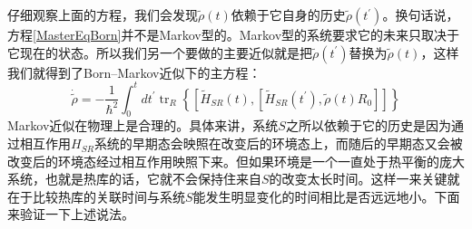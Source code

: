 仔细观察上面的方程，我们会发现$\tilde{\rho}(t)$依赖于它自身的历史$\tilde{\rho}\left(t^{\prime}\right)$。换句话说，方程\eqref{MasterEqBorn}并不是Markov型的。Markov型的系统要求它的未来只取决于它现在的状态。所以我们另一个要做的主要近似就是把$\tilde{\rho}\left(t^{\prime}\right)$替换为$\tilde{\rho}(t)$，这样我们就得到了Born--Markov近似下的主方程：
\begin{equation}
\dot{\tilde{\rho}}=-\frac{1}{\hbar^{2}} \int_{0}^{t} d t^{\prime} \operatorname{tr}_{R}\left\{\left[\tilde{H}_{S R}(t),\left[\tilde{H}_{S R}\left(t^{\prime}\right), \tilde{\rho}(t) R_{0}\right]\right]\right\}
\end{equation}
Markov近似在物理上是合理的。具体来讲，系统$S$之所以依赖于它的历史是因为通过相互作用$H_{SR}$系统的早期态会映照在改变后的环境态上，而随后的早期态又会被改变后的环境态经过相互作用映照下来。但如果环境是一个一直处于热平衡的庞大系统，也就是热库的话，它就不会保持住来自$S$的改变太长时间。这样一来关键就在于比较热库的关联时间与系统$S$能发生明显变化的时间相比是否远远地小。下面来验证一下上述说法。

